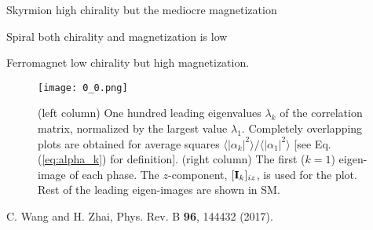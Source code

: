 \documentclass[reprint,amsmath,amssymb,aps,showpacs,superscriptaddress,prl]{revtex4-1}
\begin{document}
Skyrmion 
high chirality but the mediocre magnetization


Spiral 
both chirality and magnetization is low


Ferromagnet
low chirality but high magnetization. 



\begin{figure}[h]
\texttt{[image: 0\_0.png]}
\caption{(left column) One hundred leading eigenvalues $\lambda_k$ of the correlation matrix, normalized by the largest value $\lambda_1$. Completely overlapping plots are obtained for average squares $\langle |\alpha_k |^2 \rangle / \langle |\alpha_1 |^2 \rangle$ [see Eq. (\ref{eq:alpha_k}) for definition]. (right column) The first ($k=1$) eigen-image of each phase. The $z$-component, $[{\bf I}_k ]_{iz}$, is used for the plot. Rest of the leading eigen-images are shown in SM. }\label{fig:0}
\end{figure}


\begin{thebibliography}{99}

 C. Wang and H. Zhai, Phys. Rev. B {\bf 96}, 144432 (2017).


\end{thebibliography}

%
%
\end{document}
